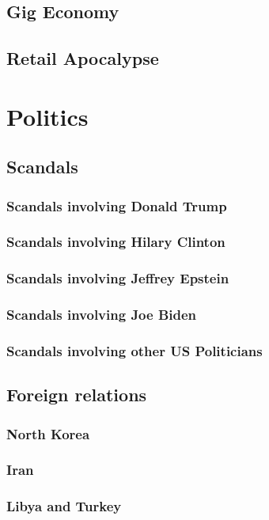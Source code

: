 		\subsection{Gig Economy}
		\subsection{Retail Apocalypse}
		
		
	\section{Politics}
		\subsection{Scandals}
			\subsubsection{Scandals involving Donald Trump}
			\subsubsection{Scandals involving Hilary Clinton}
			\subsubsection{Scandals involving Jeffrey Epstein}
			\subsubsection{Scandals involving Joe Biden}
			\subsubsection{Scandals involving other US Politicians}

		\subsection{Foreign relations}	
			\subsubsection{North Korea}
			\subsubsection{Iran}
			\subsubsection{Libya and Turkey}
